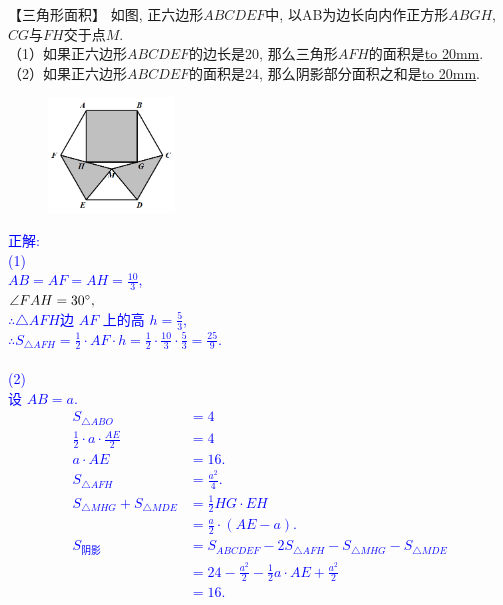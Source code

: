 \item {
    【三角形面积】
    如图, 正六边形$ABCDEF$中, 以AB为边长向内作正方形$ABGH$, $CG$与$FH$交于点$M$.\\
    （1）如果正六边形$ABCDEF$的边长是20, 那么三角形$AFH$的面积是\underline{\hbox to 20mm{}}.\\
    （2）如果正六边形$ABCDEF$的面积是24, 那么阴影部分面积之和是\underline{\hbox to 20mm{}}.
    \begin{figure}[H] 
        \centering
        \includegraphics[width=0.3\textwidth]{./pics/Chapter_2/3.png}
    \end{figure}
    \ifshowSolution 
        \fangsong{}\textcolor{blue}{
            正解: \\
            (1) \\
            $AB = AF = AH = \frac{10}{3}$,\\
            $\angle FAH = 30\degree,$\\
            $\therefore \triangle AFH$边 $AF$ 上的高 $h=\frac53$,\\
            $\therefore S_{\triangle AFH} = \frac12\cdot AF\cdot h = \frac12\cdot \frac{10}{3}\cdot \frac53 = \frac{25}{9}.$ \\
            \\(2)\\
            设 $AB=a.$
            \begin{align*}
                S_{\triangle ABO} &= 4 \\
                \frac12\cdot a\cdot \frac{AE}{2} &= 4 \\
                a\cdot AE &= 16.\\
                S_{\triangle AFH} &= \frac{a^2}{4}. \\
                S_{\triangle MHG} + S_{\triangle MDE} &= \frac{1}{2}HG\cdot EH \\
                &= \frac{a}{2}\cdot (AE-a). \\
                S_{阴影} &= S_{ABCDEF} - 2S_{\triangle AFH} - S_{\triangle MHG} - S_{\triangle MDE} \\
                &= 24 - \frac{a^2}{2} - \frac{1}{2}a\cdot AE + \frac{a^2}{2} \\
                &= 16.
            \end{align*}
        }
    \else
        \vspace{1cm}
    \fi
}

